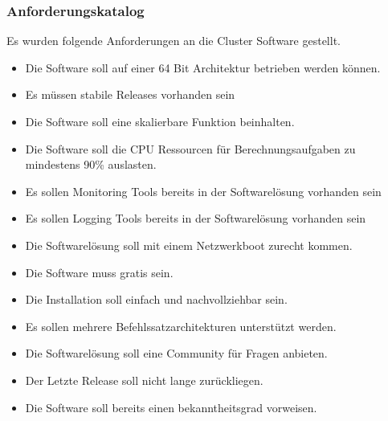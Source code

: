\subsubsection{Anforderungskatalog}
Es wurden folgende Anforderungen an die Cluster Software gestellt.

\begin{itemize}
\item Die Software soll auf einer 64 Bit Architektur betrieben werden können.
\item Es müssen stabile Releases vorhanden sein
\item Die Software soll eine skalierbare Funktion beinhalten.
\item Die Software soll die CPU Ressourcen für Berechnungsaufgaben zu mindestens 90\% auslasten.
\item Es sollen Monitoring Tools bereits in der Softwarelösung vorhanden sein
\item Es sollen Logging Tools bereits in der Softwarelösung vorhanden sein
\item Die Softwarelösung soll mit einem Netzwerkboot zurecht kommen.
\item Die Software muss gratis sein.
\item Die Installation soll einfach und nachvollziehbar sein.
\item Es sollen mehrere Befehlssatzarchitekturen unterstützt werden.
\item Die Softwarelösung soll eine Community für Fragen anbieten.
\item Der Letzte Release soll nicht lange zurückliegen.
\item Die Software soll bereits einen bekanntheitsgrad vorweisen.
\end{itemize}



